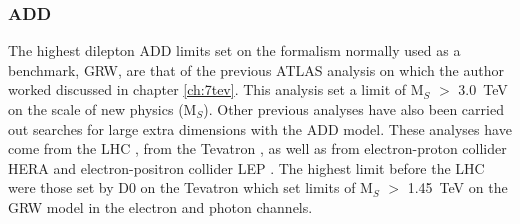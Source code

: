     \subsubsection*{ADD}
        The highest dilepton ADD limits set on the formalism normally used as a benchmark, GRW, are that of the previous ATLAS analysis on which the author worked \cite{PhysRevD.87.015010} discussed in chapter \ref{ch:7tev}. This analysis set a limit of M$_{S}$ $>$ 3.0~TeV on the scale of new physics (M$_{S}$). Other previous analyses have also been carried out searches for large extra dimensions with the ADD model. These analyses have come from the LHC \cite{PhysRevD.87.015010,ATLAS:2011ab,Chatrchyan201215,PhysRevLett.108.111801}, from the Tevatron \cite{Abazov:2008as,PhysRevLett.95.161602,PhysRevLett.103.191803}, as well as from electron-proton collider HERA \cite{Adloff2000358,Chekanov200423} and electron-positron collider LEP \cite{Acciarri1999281,Acciarri1999135,Abreu200045,Abreu200067,Abbiendi2003331,Abbiendi2000553}. The highest limit before the LHC were those set by D0 on the Tevatron \cite{Abazov:2008as} which set limits of M$_{S}$ $>$ 1.45~TeV on the GRW model in the electron and photon channels. 








